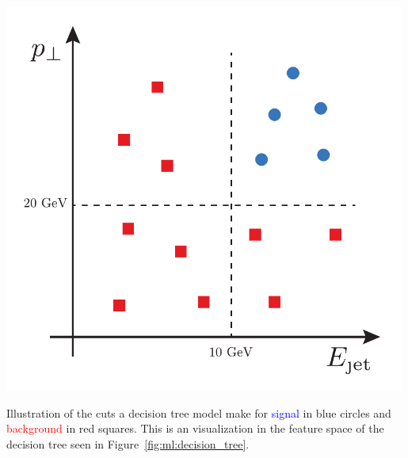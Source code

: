 \documentclass[a4paper, twoside, nobib]{tufte-book}
\begin{document}
\begin{marginfigure}[-3cm]
  \includegraphics[width=0.99\textwidth, trim=10 10 10 10, clip]{figures/decision_tree/tree_example.pdf}%
  \caption[Decision Tree Cuts In Feature Space]{Illustration of the cuts a decision tree model make for \textcolor{blue}{signal} in blue circles and \textcolor{red}{background} in red squares. This is an visualization in the feature space of the decision tree seen in Figure~\ref{fig:ml:decision_tree}.}
  \label{fig:ml:decision_tree_feature_space}
\end{marginfigure}
\end{document}
